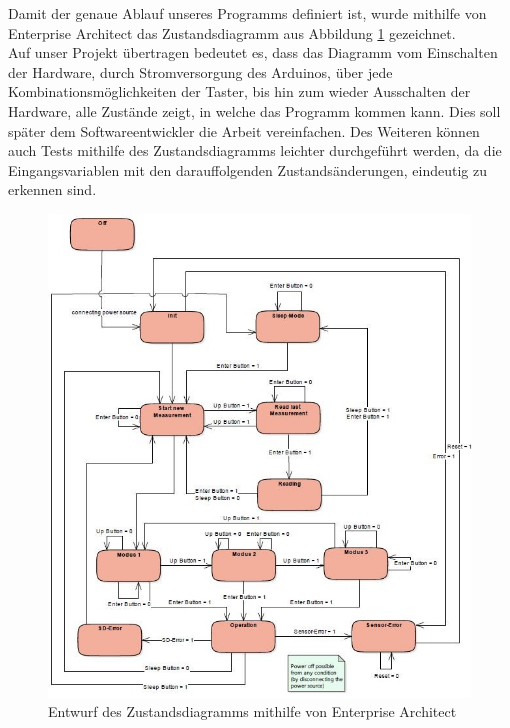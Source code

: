 \label{Zustand}

Damit der genaue Ablauf unseres Programms definiert ist, wurde mithilfe von Enterprise Architect das Zustandsdiagramm aus Abbildung \ref{fig:Statemachine} gezeichnet. \\
Auf unser Projekt übertragen bedeutet es, dass das Diagramm vom Einschalten der Hardware, durch Stromversorgung des Arduinos, über jede Kombinationsmöglichkeiten der Taster, bis hin zum wieder Ausschalten der Hardware, alle Zustände zeigt, in welche das Programm kommen kann. Dies soll später dem Softwareentwickler die Arbeit vereinfachen. Des Weiteren können auch Tests mithilfe des Zustandsdiagramms leichter durchgeführt werden, da die Eingangsvariablen mit den darauffolgenden Zustandsänderungen, eindeutig zu erkennen sind. \\

\begin{figure}[!hbt]
	\centering
	\includegraphics[width=0.9\linewidth]{Images/Statemachine}
	\caption{Entwurf des Zustandsdiagramms mithilfe von Enterprise Architect}
	\label{fig:Statemachine}
\end{figure}
